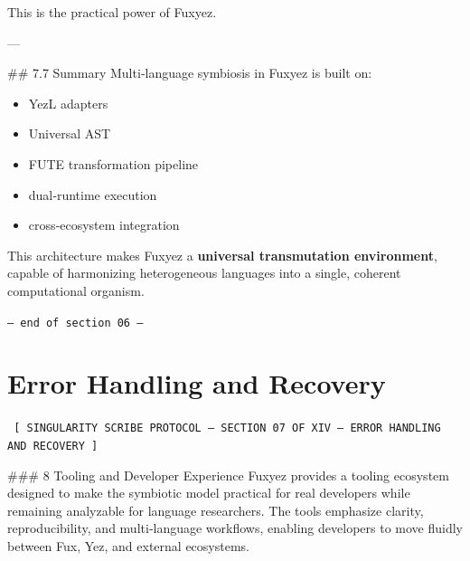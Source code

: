 \documentclass[12pt, a4paper]{book}
\begin{document}
This is the practical power of Fuxyez.

---

\#\# 7.7 Summary  
Multi‑language symbiosis in Fuxyez is built on:

\begin{itemize}
  \item YezL adapters  
  \item Universal AST  
  \item FUTE transformation pipeline  
  \item dual‑runtime execution  
  \item cross‑ecosystem integration  
\end{itemize}

This architecture makes Fuxyez a \textbf{universal transmutation environment}, capable of harmonizing heterogeneous languages into a single, coherent computational organism.
    
    \vspace{1cm}
    \begin{center}
    \color{alienPurple}\texttt{--- end of section 06 ---}
    \end{center}
    \clearpage
    

    \chapter*{Error Handling and Recovery}
    
    
    \begin{glyphbox}
    \centering
    \color{neonCyan}\fontsize{8}{10}\selectfont\texttt{
    [ SINGULARITY SCRIBE PROTOCOL -- SECTION 07 OF XIV -- ERROR HANDLING AND RECOVERY ]
    }
    \end{glyphbox}
    \vspace{0.3cm}
    
    
    \#\#\# 8 Tooling and Developer Experience  
Fuxyez provides a tooling ecosystem designed to make the symbiotic model practical for real developers while remaining analyzable for language researchers. The tools emphasize clarity, reproducibility, and multi‑language workflows, enabling developers to move fluidly between Fux, Yez, and external ecosystems.
\end{document}
